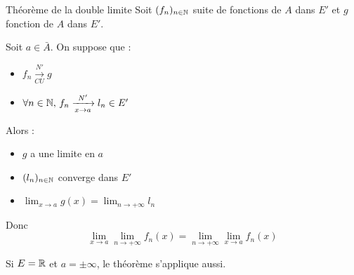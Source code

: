 \begin{theoreme}{Théorème de la double limite}{}
    Soit $(f_n)_{n \in \mathbb{N}}$ suite de fonctions de $A$ dans $E'$ et $g$ fonction de $A$ dans $E'$.

    Soit $a \in \bar A$. On suppose que : 
    \begin{itemize}
        \item $f_n \xrightarrow[CU]{N'} g$ 
        \item $\forall n \in \mathbb{N}, \, f_n \xrightarrow[x \to a]{N'} l_n \in E'$
    \end{itemize}

    Alors : 
    \begin{itemize}
        \item $g$ a une limite en $a$
        \item $(l_n)_{n \in \mathbb{N}}$ converge dans $E'$
        \item $\displaystyle \lim_{x \to a} g(x) = \lim_{n \to +\infty} l_n$
    \end{itemize}

    Donc $$\lim_{x \to a} \lim_{n \to +\infty} f_n(x) = \lim_{n \to +\infty} \lim_{x \to a} f_n(x)$$
\end{theoreme}

Si $E = \mathbb{R}$ et $a = \pm \infty$, le théorème s'applique aussi.


